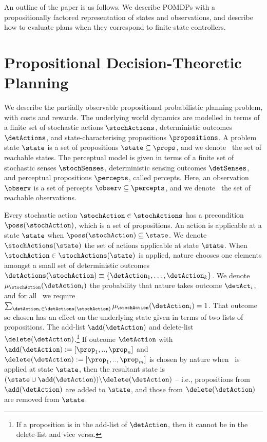 \documentclass[letterpaper]{article}
\begin{document}
An outline of the paper is as follows. We describe POMDPs with a
propositionally factored representation of states and observations,
and describe how to evaluate plans when they correspond to
finite-state controllers.

\section{Propositional Decision-Theoretic Planning}



We describe the partially observable propositional probabilistic
planning problem, with costs and rewards. The underlying world
dynamics are modelled in terms of a finite set of stochastic actions
$\stochActions$, deterministic outcomes $\detActions$, and
state-characterising propositions $\propositions$.  A problem state
$\state$ is a set of propositions $\state \subseteq \props$, and we
denote \states\ the set of reachable states. The perceptual model is
given in terms of a finite set of stochastic senses $\stochSenses$,
deterministic sensing outcomes $\detSenses$, and perceptual
propositions $\percepts$, called percepts. Here, an observation
$\observ$ is a set of percepts $\observ \subseteq \percepts$, and we
denote \observations\ the set of reachable observations.

Every stochastic action $\stochAction \in \stochActions$ has a
precondition $\poss(\stochAction)$, which is a set of propositions. An
action is applicable at a state $\state$ when $\poss(\stochAction)
\subseteq \state$. We denote $\stochActions(\state)$ the set of
actions applicable at state $\state$.  When $\stochAction \in
\stochActions(\state)$ is applied, nature chooses one elements amongst
a small set of deterministic outcomes $\detActions(\stochAction)
\equiv \{\detAction_1, \ldots, \detAction_k \}$. We denote
$\mu_{\stochAction}(\detAction_i)$ the probability that nature takes
outcome $\detAct_i$, and for all \stochAction\ we require
$\sum_{\detAction_i \in \detActions(\stochAction)}
\mu_{\stochAction}(\detAction_i) = 1$. That outcome so chosen has an
effect on the underlying state given in terms of two lists of
propositions. The add-list $\add(\detAction)$ and delete-list
$\delete(\detAction)$.\footnote{If a proposition is in the add-list of
$\detAction$, then it cannot be in the delete-list and vice versa.}
If outcome $\detAction$ with $\add(\detAction) := [\prop_1,
..,\prop_n]$ and $\delete(\detAction) := [\prop_1, ..,\prop_m]$ is
chosen by nature when \stochAction\ is applied at state $\state$, then
the resultant state is $ ( \state \cup \add(\detAction) ) \backslash
\delete(\detAction)$ -- i.e., propositions from $\add(\detAction)$ are
added to $\state$, and those from $\delete(\detAction)$ are removed
from $\state$.
\end{document}
